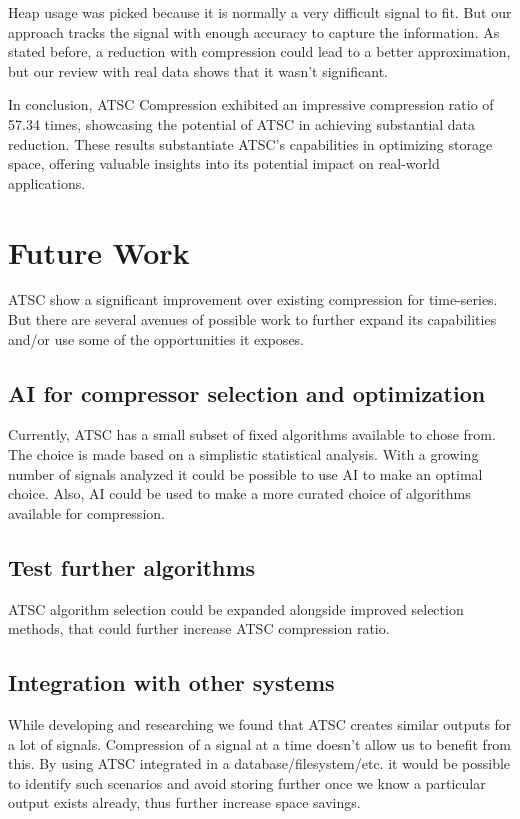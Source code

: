 \documentclass[conference]{IEEEtran}
\begin{document}
Heap usage was picked because it is normally a very difficult signal to fit. But our approach tracks the signal with enough accuracy to capture the information. 
As stated before, a reduction with compression could lead to a better approximation, but our review with real data shows that it wasn't significant.

In conclusion, ATSC Compression exhibited an impressive compression ratio of 57.34 times, showcasing the potential of ATSC in achieving substantial data reduction. 
These results substantiate ATSC's capabilities in optimizing storage space, offering valuable insights into its potential impact on real-world applications. 

\section{Future Work}

ATSC show a significant improvement over existing compression for time-series. But there are several avenues of possible work to further expand its capabilities and/or use some of the opportunities it exposes.

\subsection{AI for compressor selection and optimization}

Currently, ATSC has a small subset of fixed algorithms available to chose from. The choice is made based on a simplistic statistical analysis. With a growing number of signals analyzed it could be possible to use AI to make an optimal choice. 
Also, AI could be used to make a more curated choice of algorithms available for compression.

\subsection*{Test further algorithms}

ATSC algorithm selection could be expanded alongside improved selection methods, that could further increase ATSC compression ratio.

\subsection{Integration with other systems}

While developing and researching we found that ATSC creates similar outputs for a lot of signals. Compression of a signal at a time doesn't allow us to benefit from this. By using ATSC integrated in a database/filesystem/etc. it would be possible
to identify such scenarios and avoid storing further once we know a particular output exists already, thus further increase space savings.
\end{document}
